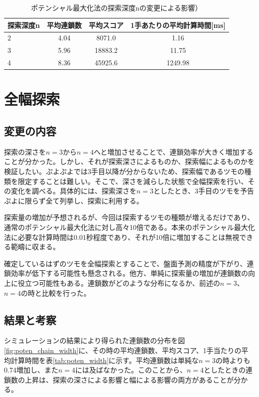 \documentclass[12pt]{jreport}
\begin{document}
\begin{table}[tb]
\begin{center}
\caption{ポテンシャル最大化法の探索深度nの変更による影響）} \label{tab:poten_depth}
\begin{tabular}{|l|c|c|c|} \hline
探索深度n & 平均連鎖数 & 平均スコア & 1手あたりの平均計算時間[ms]\\ \hline
2 & 4.04 & 8071.0 & 1.16\\ \hline
3 & 5.96 & 18883.2 & 11.75\\ \hline
4 & 8.36 & 45925.6 & 1249.98\\ \hline
\end{tabular}
\end{center}
\end{table}

\section{全幅探索}
\subsection{変更の内容}
探索の深さを$n=3$から$n=4$へと増加させることで、連鎖効率が大きく増加することが分かった。しかし、それが探索深さによるものか、探索幅によるものかを検証したい。ぷよぷよでは3手目以降が分からないため、探索幅であるツモの種類を限定することは難しい。そこで、深さを減らした状態で全幅探索を行い、その変化を調べる。具体的には、探索深さを$n=3$としたとき、3手目のツモを予告ぷよに限らず全て列挙し、探索に利用する。

探索量の増加が予想されるが、今回は探索するツモの種類が増えるだけであり、通常のポテンシャル最大化法に対し高々10倍である。本来のポテンシャル最大化法に必要な計算時間は0.01秒程度であり、それが10倍に増加することは無視できる範疇に収まる。

確定しているはずのツモを全幅探索とすることで、盤面予測の精度が下がり、連鎖効率が低下する可能性も懸念される。他方、単純に探索量の増加が連鎖数の向上に役立つ可能性もある。連鎖数がどのような分布になるか、前述の$n=3$、$n=4$の時と比較を行った。

\subsection{結果と考察}
シミュレーションの結果により得られた連鎖数の分布を図\ref{fig:poten_chain_width}に、その時の平均連鎖数、平均スコア、1手当たりの平均計算時間を表\ref{tab:poten_width}に示す。平均連鎖数は単純な$n=3$の時よりも0.74増加し、また$n=4$には及ばなかった。このことから、$n=4$としたときの連鎖数の上昇は、探索の深さによる影響と幅による影響の両方があることが分かる。
\end{document}
